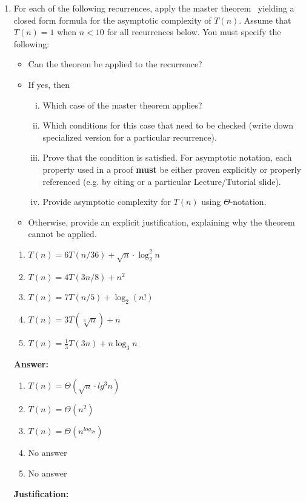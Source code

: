 \documentclass[dvipsnames]{article}
\begin{document}
\begin{enumerate}
  \clearpage
  \item For each of the following recurrences, apply the master theorem~\cite[Theorem~4.1]{Cormen2022} yielding a closed form formula
  for the asymptotic complexity of $T(n)$.
  Assume that $T(n) = 1$ when $n < 10$ for all recurrences below. You must specify the following:
  \begin{itemize}
    \item Can the theorem be applied to the recurrence?
    \item If yes, then
    \begin{enumerate}[(i)]
      \item Which case of the master theorem applies?
      \item Which conditions for this case that need to be checked (write down specialized version for a particular recurrence).
      \item Prove that the condition is satisfied.
      For asymptotic notation, each property used in a proof \textbf{must} be either
      proven explicitly or properly referenced (e.g. by citing \cite{Cormen2022} or a particular Lecture/Tutorial slide).
      \item Provide asymptotic complexity for $T(n)$ using $\Theta$-notation.
    \end{enumerate}
    \item Otherwise, provide an explicit justification, explaining why the theorem cannot be applied.
  \end{itemize}
  \begin{enumerate}
    \item $T(n) = 6 T(n / 36) + \sqrt{n} \cdot \log_2^2 n$
    \item $T(n) = 4 T(3 n / 8) + n^2$
    \item $T(n) = 7 T(n / 5) + \log_2 \left(n!\right)$
    \item $T(n) = 3 T(\sqrt[3]{n}) + n$               
    \item $T(n) = \frac{1}{3} T(3n) + n \log_3 n$     
  \end{enumerate}

  \color{blue}
  \textbf{Answer:}
   \begin{enumerate}
    \item $T(n) = \Theta(\sqrt{n} \cdot lg^3n)$
    \item $T(n) =  \Theta(n^2)$
    \item $T(n) = \Theta (n^{log_57})$
    \item No answer              
    \item No answer    
  \end{enumerate}
  \textbf{Justification: }
    \begin{enumerate}


\end{enumerate}
\end{enumerate}
\end{document}
